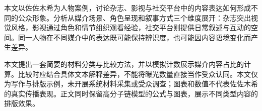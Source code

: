 \scuAbstractZhHeading
本文以佐佐木希为人物案例，讨论杂志、影视与社交平台中的内容表达如何形成不同的公众形象。分析从媒介场景、角色呈现和叙事方式三个维度展开：杂志突出视觉风格，影视通过角色和情节组织观看经验，社交平台则提供日常叙述与互动的空间。同一人物在不同媒介中的表达既可能保持辨识度，也可能因内容语境变化而产生差异。

本文提出一套简要的材料分类与比较方法，并以模拟计数展示媒介内容占比的计算。比较时应结合具体文本解释差异，不能将曝光数量直接当作受众认同。本文仅为写作与排版示例，未开展系统材料采集或受众调查；图表和数值不代表佐佐木希的真实传播表现。正文同时保留高分子链模型的公式与图表，展示不同类型内容的排版效果。

\par\vspace{20bp}\scuKeywordsZh
